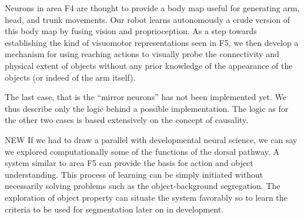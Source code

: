 \ifverbose
Neurons in area F4 are thought to provide a body map useful for
generating arm, head, and trunk movements. Our robot learns
autonomously a crude version of this body map by fusing vision and
proprioception.  As a step towards establishing the kind of visuomotor
representations seen in F5, we then develop a mechanism for using
reaching actions to visually probe the connectivity and physical
extent of objects without any prior knowledge of the appearance of the
objects (or indeed of the arm itself).
\fi

\ifverbose
The last case, that is the ``mirror neurons'' has not been implemented
yet.  We thus describe only the logic behind a possible
implementation. The logic as for the other two cases is based
extensively on the concept of causality.
\fi

\ifverbose
NEW If we had to draw a parallel with developmental neural science, we can
say we explored computationally some of the functions of the dorsal
pathway. A system similar to area F5 can provide the basis for action
and object understanding. This process of learning can be simply
initiated without necessarily solving problems such as the
object-background segregation. The exploration of object property can
situate the system favorably so to learn the criteria to be used for
segmentation later on in development.
\fi
